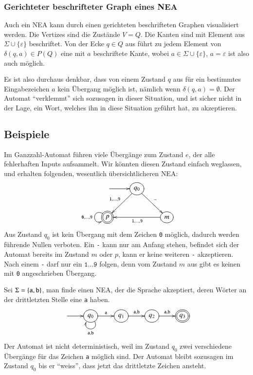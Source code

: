 \subsubsection{Gerichteter beschrifteter Graph eines NEA}
%
Auch ein NEA kann durch einen gerichteten beschrifteten Graphen
visualisiert werden.
Die Vertizes sind die Zustände $V=Q$.
Die Kanten sind mit Element aus $\Sigma\cup\{\varepsilon\}$ beschriftet.
Von der Ecke $q\in Q$ aus führt zu jedem Element von $\delta(q,a)\in P(Q)$
eine mit $a$ beschriftete Kante, wobei $a\in \Sigma\cup\{\varepsilon\}$, $a=\varepsilon$ ist also auch möglich.

Es ist also durchaus denkbar, dass von einem Zustand $q$ aus für ein
bestimmtes Eingabezeichen $a$ kein Übergang möglich ist, nämlich
wenn $\delta(q,a)=\emptyset$.
Der Automat ``verklemmt'' sich sozusagen in dieser Situation, und ist
sicher nicht in der Lage, ein Wort, welches
ihn in diese Situation geführt hat, zu akzeptieren.


\subsection{Beispiele}
\begin{beispiel}
Im Ganzzahl-Automat führen viele Übergänge zum Zustand $e$, der
alle fehlerhaften Inputs aufsammelt.
Wir könnten diesen Zustand einfach
weglassen, und erhalten folgenden, wesentlich übersichtlicheren NEA:
\[
\entrymodifiers={++[o][F]}
\xymatrix{
*+\txt{}\ar[r]
	&{q_0}  \ar[dl]_{{\tt 1},\dots,{\tt 9}} \ar[dr]^{\tt -}
\\
*++[o][F=]{p}\ar@(ul,dl)_{{\tt 0},\dots,{\tt 9}}
	&*+\txt{}
		&{m} \ar[ll]^{{\tt 1},\dots,{\tt 9}}
}
\]
Aus Zustand $q_0$ ist kein Übergang mit dem Zeichen {\tt 0} möglich,
dadurch werden führende Nullen verboten.
Ein {\tt -} kann nur am Anfang
stehen, befindet sich der Automat bereits im Zustand $m$ oder $p$, kann 
er keine weiteren {\tt -} akzeptieren.
Nach einem {\tt -} darf nur ein $\texttt{1}\dots\texttt{9}$ folgen,
denn vom Zustand $m$
aus gibt es keinen mit \texttt{0} angeschrieben Übergang.
\end{beispiel}

\begin{beispiel}
Sei $\Sigma=\{{\tt a},{\tt b}\}$, man finde einen NEA, der die 
Sprache akzeptiert, deren Wörter an der drittletzten Stelle
eine {\tt a} haben.
\[
\entrymodifiers={++[o][F]}
\xymatrix{
*+\txt{} \ar[r]
	&{q_0} \ar[r]^{\tt a} \ar@(dr,dl)^{{\tt a},{\tt b}}
		&{q_1}\ar[r]^{{\tt a},{\tt b}}
			&{q_2}\ar[r]^{{\tt a},{\tt b}}
				&*++[o][F=]{q_3}
}
\]
Der Automat ist nicht deterministisch, weil im Zustand $q_0$ zwei verschiedene
Übergänge für das Zeichen {\tt a} möglich sind.
Der Automat bleibt
sozusagen im Zustand $q_0$ bis er ``weiss'', dass jetzt das drittletzte
Zeichen ansteht.
\end{beispiel}

